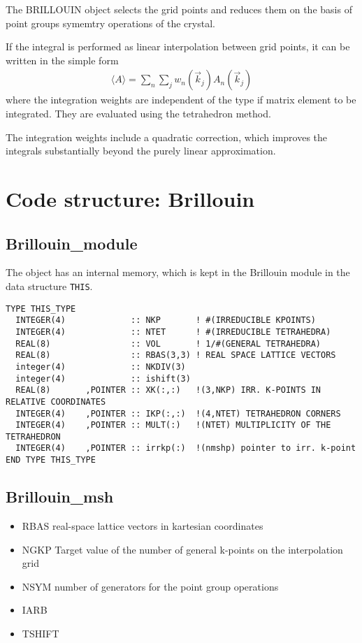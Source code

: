 \documentclass[11pt,a4paper]{report}
\begin{document}
The BRILLOUIN object selects the grid points and reduces them on the
basis of point groups symemtry operations of the crystal.

If the integral is performed as linear interpolation between grid
points, it can be written in the simple form
\begin{eqnarray}
\langle A\rangle=\sum_n\sum_{j} w_n(\vec{k}_j) A_n(\vec{k}_j)
\end{eqnarray}
where the integration weights are independent of the type if matrix
element to be integrated.\cite{bloechl94_prb49_16223} They are
evaluated using the tetrahedron method.

The integration weights include a quadratic correction, which improves
the integrals substantially beyond the purely linear
approximation.\cite{bloechl94_prb49_16223}

\section{Code structure: Brillouin}
\subsection{Brillouin\_module}
The object has an internal memory, which is kept in the Brillouin
module in the data structure \verb|THIS|.
\begin{verbatim}
TYPE THIS_TYPE
  INTEGER(4)             :: NKP       ! #(IRREDUCIBLE KPOINTS)
  INTEGER(4)             :: NTET      ! #(IRREDUCIBLE TETRAHEDRA)
  REAL(8)                :: VOL       ! 1/#(GENERAL TETRAHEDRA)
  REAL(8)                :: RBAS(3,3) ! REAL SPACE LATTICE VECTORS
  integer(4)             :: NKDIV(3)
  integer(4)             :: ishift(3)
  REAL(8)       ,POINTER :: XK(:,:)   !(3,NKP) IRR. K-POINTS IN RELATIVE COORDINATES
  INTEGER(4)    ,POINTER :: IKP(:,:)  !(4,NTET) TETRAHEDRON CORNERS
  INTEGER(4)    ,POINTER :: MULT(:)   !(NTET) MULTIPLICITY OF THE TETRAHEDRON
  INTEGER(4)    ,POINTER :: irrkp(:)  !(nmshp) pointer to irr. k-point
END TYPE THIS_TYPE
\end{verbatim}


\subsection{Brillouin\_msh}
\begin{itemize}
\item RBAS real-space lattice vectors in kartesian coordinates
\item NGKP Target value of the number of general
  k-points on the interpolation grid
\item NSYM number of generators for the point group operations 
\item IARB
\item TSHIFT
\end{itemize}
\end{document}
